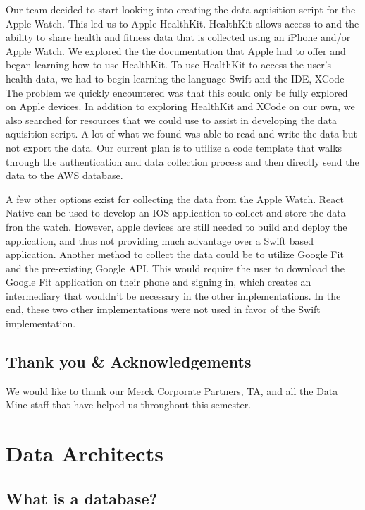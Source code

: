 \documentclass[]{book}
\begin{document}
Our team decided to start looking into creating the data aquisition
script for the Apple Watch. This led us to Apple HealthKit. HealthKit
allows access to and the ability to share health and fitness data that
is collected using an iPhone and/or Apple Watch. We explored the the
documentation that Apple had to offer and began learning how to use
HealthKit. To use HealthKit to access the user's health data, we had to
begin learning the language Swift and the IDE, XCode The problem we
quickly encountered was that this could only be fully explored on Apple
devices. In addition to exploring HealthKit and XCode on our own, we
also searched for resources that we could use to assist in developing
the data aquisition script. A lot of what we found was able to read and
write the data but not export the data. Our current plan is to utilize a
code template that walks through the authentication and data collection
process and then directly send the data to the AWS database.

A few other options exist for collecting the data from the Apple Watch.
React Native can be used to develop an IOS application to collect and
store the data fron the watch. However, apple devices are still needed
to build and deploy the application, and thus not providing much
advantage over a Swift based application. Another method to collect the
data could be to utilize Google Fit and the pre-existing Google API.
This would require the user to download the Google Fit application on
their phone and signing in, which creates an intermediary that wouldn't
be necessary in the other implementations. In the end, these two other
implementations were not used in favor of the Swift implementation.

\section{Thank you \&
Acknowledgements}\label{thank-you-acknowledgements}

We would like to thank our Merck Corporate Partners, TA, and all the
Data Mine staff that have helped us throughout this semester.

\chapter{Data Architects}\label{data-architects}

\section{What is a database?}\label{what-is-a-database}
\end{document}
